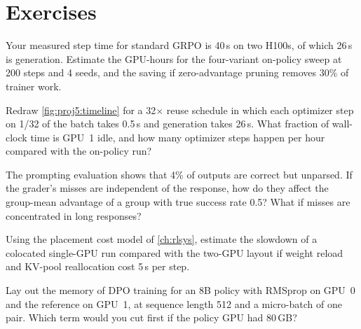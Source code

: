 \section{Exercises}\label{sec:proj5:exercises}

\begin{exercise}[budgeting]
Your measured step time for standard GRPO is 40\,s on two H100s, of which 26\,s is generation. Estimate
the GPU-hours for the four-variant on-policy sweep at 200 steps and 4 seeds, and the saving if
zero-advantage pruning removes 30\% of trainer work.
\end{exercise}

\begin{exercise}
Redraw \cref{fig:proj5:timeline} for a 32$\times$ reuse schedule in which each optimizer step on 1/32 of the
batch takes 0.5\,s and generation takes 26\,s. What fraction of wall-clock time is GPU~1 idle, and how
many optimizer steps happen per hour compared with the on-policy run?
\end{exercise}

\begin{exercise}
The prompting evaluation shows that 4\% of outputs are correct but unparsed. If the grader's misses are
independent of the response, how do they affect the group-mean advantage of a group with true success
rate 0.5? What if misses are concentrated in long responses?
\end{exercise}

\begin{exercise}
Using the placement cost model of \cref{ch:rlsys}, estimate the slowdown of a colocated single-GPU run
compared with the two-GPU layout if weight reload and KV-pool reallocation cost 5\,s per step.
\end{exercise}

\begin{exercise}
Lay out the memory of DPO training for an 8B policy with RMSprop on GPU~0 and the reference on GPU~1,
at sequence length 512 and a micro-batch of one pair. Which term would you cut first if the policy GPU
had 80\,GB?
\end{exercise}
